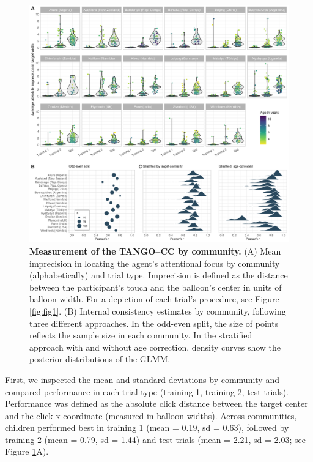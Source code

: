 \documentclass[
  man,floatsintext]{apa7}
\begin{document}
\begin{figure}

{\centering \includegraphics[width=1\linewidth]{../figures/TANGO-CC-results} 

}

\caption{\textbf{Measurement of the TANGO--CC by community.} (A) Mean imprecision in locating the agent's attentional focus by community (alphabetically) and trial type. Imprecision is defined as the distance between the participant's touch and the balloon's center in units of balloon width. For a depiction of each trial's procedure, see Figure \ref{fig:fig1}. (B) Internal consistency estimates by community, following three different approaches. In the odd-even split, the size of points reflects the sample size in each community. In the stratified approach with and without age correction, density curves show the posterior distributions of the GLMM.}\label{fig:fig2}
\end{figure}

First, we inspected the mean and standard deviations by community and compared performance in each trial type (training 1, training 2, test trials).
Performance was defined as the absolute click distance between the target center and the click x coordinate (measured in balloon widths).
Across communities, children performed best in training 1 (mean = 0.19, sd = 0.63), followed by training 2 (mean = 0.79, sd = 1.44) and test trials (mean = 2.21, sd = 2.03; see Figure \ref{fig:fig2}A).
\end{document}
